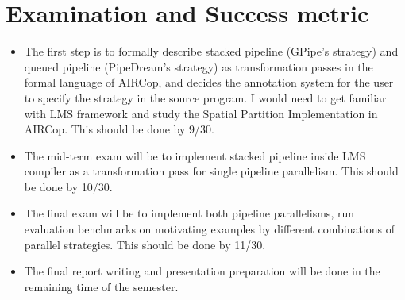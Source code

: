 \documentclass[sigplan]{acmart}\settopmatter{printfolios=true,printccs=false,printacmref=false}
\begin{document}
\section{Examination and Success metric}
\begin{itemize}
  \item The first step is to formally describe stacked pipeline (GPipe's strategy) and queued pipeline (PipeDream's strategy) as transformation passes in the formal language of AIRCop, and decides the annotation system for the user to specify the strategy in the source program. I would need to get familiar with LMS framework and study the Spatial Partition Implementation in AIRCop. This should be done by 9/30.
  \item The mid-term exam will be to implement stacked pipeline inside LMS compiler as a transformation pass for single pipeline parallelism. This should be done by 10/30.
  \item The final exam will be to implement both pipeline parallelisms, run evaluation benchmarks on motivating examples by different combinations of parallel strategies. This should be done by 11/30.
  \item The final report writing and presentation preparation will be done in the remaining time of the semester.
\end{itemize}
\end{document}
